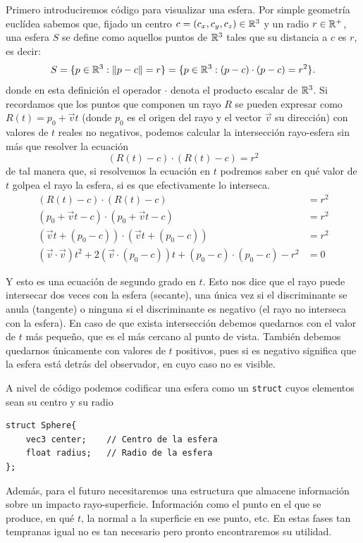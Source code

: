 Primero introduciremos código para visualizar una esfera. Por simple geometría euclídea sabemos que, fijado un centro $c=(c_x,c_y,c_z)\in\mathbb{R}^3$ y un radio $r\in\mathbb{R}^+$, una esfera $S$ se define como aquellos puntos de $\mathbb{R}^3$ tales que su distancia a $c$ es $r$, es decir:
$$
S = \{p\in\mathbb{R}^3:\|p-c\|=r\} = \{p\in\mathbb{R}^3:(p-c)\cdot (p-c)=r^2\}. 
$$
donde en esta definición el operador $\cdot$ denota el producto escalar de $\mathbb{R}^3$. Si recordamos que los puntos que componen un rayo $R$ se pueden expresar como $R(t)= p_0 + \vec vt$ (donde $p_0$ es el origen del rayo y el vector $\vec v$ su dirección) con valores de $t$ reales no negativos, podemos calcular la intersección rayo-esfera sin más que resolver la ecuación
$$
(R(t)-c)\cdot(R(t)-c)=r^2
$$
de tal manera que, si resolvemos la ecuación en $t$ podremos saber en qué valor de $t$ golpea el rayo la esfera, si es que efectivamente lo interseca.
\begin{equation}
    \label{eq:rayo-recta}
    \begin{split}
        (R(t)-c)\cdot(R(t)-c)&=r^2 \\
        (p_0 + \vec vt - c)\cdot(p_0 + \vec vt - c) &= r^2 \\
        (\vec vt + (p_0 -c))\cdot (\vec vt + (p_0 -c))&= r^2 \\
        (\vec v\cdot \vec v)t^2 + 2(\vec v\cdot(p_0-c))t + (p_0 -c)\cdot (p_0 -c) - r^2 &= 0 
    \end{split}
\end{equation}

Y esto es una ecuación de segundo grado en $t$. Esto nos dice que el rayo puede intersecar dos veces con la esfera (secante), una única vez si el discriminante se anula (tangente) o ninguna si el discriminante es negativo (el rayo no interseca con la esfera). En caso de que exista intersección debemos quedarnos con el valor de $t$ más pequeño, que es el más cercano al punto de vista. También debemos quedarnos únicamente con valores de $t$ positivos, pues si es negativo significa que la esfera está detrás del observador, en cuyo caso no es visible.

A nivel de código podemos codificar una esfera como un \verb|struct| cuyos elementos sean su centro y su radio

\begin{lstlisting}
struct Sphere{
    vec3 center;    // Centro de la esfera
    float radius;   // Radio de la esfera
};
\end{lstlisting}

Además, para el futuro necesitaremos una estructura que almacene información sobre un impacto rayo-superficie. Información como el punto en el que se produce, en qué $t$, la normal a la superficie en ese punto, etc. En estas fases tan tempranas igual no es tan necesario pero pronto encontraremos su utilidad.

